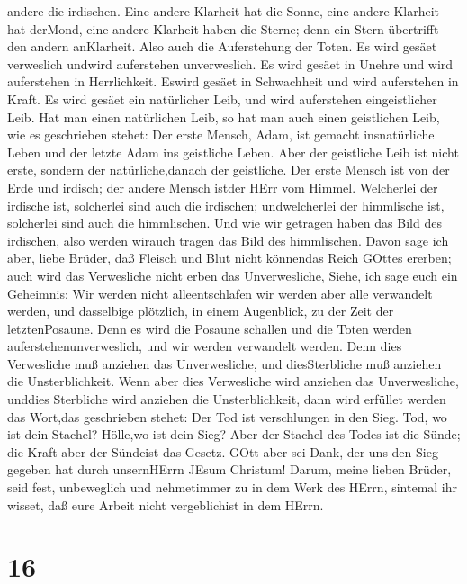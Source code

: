 andere die irdischen.  Eine andere Klarheit hat die Sonne,
eine andere Klarheit hat derMond, eine andere Klarheit haben die Sterne;
denn ein Stern übertrifft den andern anKlarheit.  Also auch
die Auferstehung der Toten. Es wird gesäet verweslich undwird
auferstehen unverweslich.  Es wird gesäet in Unehre und
wird auferstehen in Herrlichkeit. Eswird gesäet in Schwachheit und wird
auferstehen in Kraft.  Es wird gesäet ein natürlicher Leib,
und wird auferstehen eingeistlicher Leib. Hat man einen natürlichen
Leib, so hat man auch einen geistlichen Leib,  wie es
geschrieben stehet: Der erste Mensch, Adam, ist gemacht insnatürliche
Leben und der letzte Adam ins geistliche Leben.  Aber der
geistliche Leib ist nicht erste, sondern der natürliche,danach der
geistliche.  Der erste Mensch ist von der Erde und irdisch;
der andere Mensch istder HErr vom Himmel.  Welcherlei der
irdische ist, solcherlei sind auch die irdischen; undwelcherlei der
himmlische ist, solcherlei sind auch die himmlischen.  Und
wie wir getragen haben das Bild des irdischen, also werden wirauch
tragen das Bild des himmlischen.  Davon sage ich aber,
liebe Brüder, daß Fleisch und Blut nicht könnendas Reich GOttes ererben;
auch wird das Verwesliche nicht erben das Unverwesliche, 
Siehe, ich sage euch ein Geheimnis: Wir werden nicht alleentschlafen wir
werden aber alle verwandelt werden,  und dasselbige
plötzlich, in einem Augenblick, zu der Zeit der letztenPosaune. Denn es
wird die Posaune schallen und die Toten werden auferstehenunverweslich,
und wir werden verwandelt werden.  Denn dies Verwesliche
muß anziehen das Unverwesliche, und diesSterbliche muß anziehen die
Unsterblichkeit.  Wenn aber dies Verwesliche wird anziehen
das Unverwesliche, unddies Sterbliche wird anziehen die Unsterblichkeit,
dann wird erfüllet werden das Wort,das geschrieben stehet: 
Der Tod ist verschlungen in den Sieg. Tod, wo ist dein Stachel? Hölle,wo
ist dein Sieg?  Aber der Stachel des Todes ist die Sünde;
die Kraft aber der Sündeist das Gesetz.  GOtt aber sei
Dank, der uns den Sieg gegeben hat durch unsernHErrn JEsum Christum!
 Darum, meine lieben Brüder, seid fest, unbeweglich und
nehmetimmer zu in dem Werk des HErrn, sintemal ihr wisset, daß eure
Arbeit nicht vergeblichist in dem HErrn.

\hypertarget{section-15}{%
\section{16}\label{section-15}}

